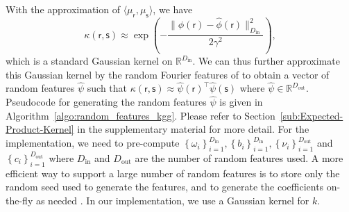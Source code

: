 \documentclass[english]{article}
\theoremstyle{plain}
\theoremstyle{plain}
\newcommand{\secref}[1]{Section~\ref{#1}}
\begin{document}
With the approximation of $\langle \mu_{\mathsf{r}},\mu_{\mathsf{s}}  \rangle$,
we have
\begin{equation}
\kappa(\mathsf{r}, \mathsf{s})\approx\exp\left(-\frac{\|\hat{\phi}(\mathsf{r})-\hat{\phi}(\mathsf{r})\|_{D_\mathrm{in}}^{2}}{2\gamma^{2}}\right),
%
\end{equation}
which is a standard Gaussian kernel on $\mathbb{R}^{D_\mathrm{in}}$.
We can thus further approximate this Gaussian kernel 
%
%
by the random Fourier features of \citeauthor{Rahimi2007} to obtain a vector 
of random features $\hat{\psi}$ such that 
$\kappa(\mathsf{r}, \mathsf{s}) \approx \hat{\psi}(\mathsf{r})^\top \hat{\psi}(\mathsf{s})$
where $\hat{\psi} \in \mathbb{R}^{D_\mathrm{out}}$. 
Pseudocode for generating the random features $\hat{\psi}$ is given in Algorithm~\ref{algo:random_features_kgg}. 
Please refer to \secref{sub:Expected-Product-Kernel} in the supplementary material for more detail.
For the implementation, we need to pre-compute $\left\{ \omega_{i}\right\} _{i=1}^{D_\mathrm{in}},\left\{ b_{i}\right\} _{i=1}^{D_\mathrm{in}},\left\{ \nu_{i}\right\} _{i=1}^{D_\mathrm{out}}$
and $\left\{ c_{i}\right\} _{i=1}^{D_\mathrm{out}}$ where $D_\mathrm{in}$ and
$D_\mathrm{out}$ are the number of random features used. 
A more efficient way to support a large number of random features 
is to store only the random seed used to generate 
the features, and to generate the coefficients  on-the-fly as needed \citep{Dai2014}. 
In our implementation, we use a Gaussian kernel for $k$.

\end{document}
